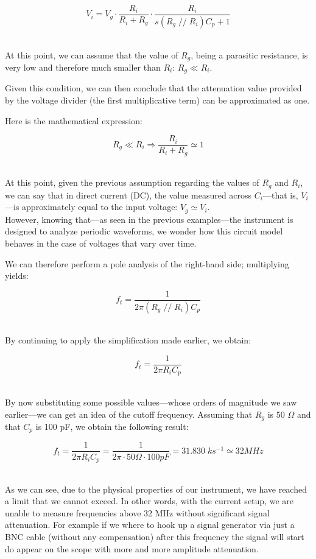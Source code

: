 \documentclass[../main.tex]{subfiles}
\begin{document}
\[ V_i = V_g \cdot \frac{R_i}{R_i + R_g} \cdot \frac{R_i}{s(R_g \;//\; R_i)C_p + 1}\]\

At this point, we can assume that the value of $R_g$, being a parasitic resistance, is very low and therefore much smaller than $R_i$: $R_g \ll R_i$.

Given this condition, we can then conclude that the attenuation value provided by the voltage divider (the first multiplicative term) can be approximated as one.

Here is the mathematical expression:

\[ R_g \ll R_i \Rightarrow \frac{R_i}{R_i + R_g}  \simeq 1 \]\

At this point, given the previous assumption regarding the values of $R_g$ and $R_i$, we can say that in direct current (DC), the value measured across $C_i$—that is, $V_i$—is approximately equal to the input voltage: $V_g \simeq V_i$.\\

However, knowing that—as seen in the previous examples—the instrument is designed to analyze periodic waveforms, we wonder how this circuit model behaves in the case of voltages that vary over time.

We can therefore perform a pole analysis of the right-hand side; multiplying yields:

\[ f_t = \frac{1}{2\pi (R_g \;//\; R_i)C_p}\]\

By continuing to apply the simplification made earlier, we obtain:

\[ f_t = \frac{1}{2\pi  R_i C_p}\]\

By now substituting some possible values—whose orders of magnitude we saw earlier—we can get an idea of the cutoff frequency.
Assuming that $R_g$ is 50 $\Omega$ and that $C_p$ is 100 pF, we obtain the following result:

\[ f_t = \frac{1}{2\pi  R_i C_p} = \frac{1}{2\pi \cdot 50 \Omega \cdot 100 \unit{pF}} = 31.830\; \unit{ks^{-1}} \simeq 32 \unit{MHz} \]\


As we can see, due to the physical properties of our instrument, we have reached a limit that we cannot exceed. In other words, with the current setup, we are unable to measure frequencies above 32 MHz without significant signal attenuation.
For example if we where to hook up a signal generator via just a BNC cable (without any compensation) after this frequency the signal will start do appear on the scope with more and more amplitude attenuation.\\
\end{document}
